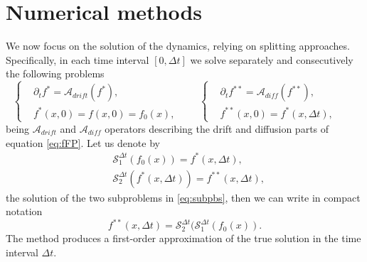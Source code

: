 \documentclass[11pt,handout]{article}%
\numberwithin{equation}{section}
\theoremstyle{definition}
\begin{document}
\section{Numerical methods }\label{sec:numerical_methods}
We now focus on the solution of the dynamics, relying on splitting approaches. Specifically, in each time interval $[0,\Delta t]$ we solve separately and consecutively the following problems 
\begin{equation}\label{eq:subpbs}
	\begin{cases}
		&\partial_t f^* = \mathcal{A}_{drift}(f^*),\\
		& f^*(x,0) = f(x,0) = f_0(x),
	\end{cases}\qquad 
	\begin{cases}
		&\partial_t f^{**}= \mathcal{A}_{diff}(f^{**}),\\
		& f^{**}(x,0) = f^*(x,\Delta t),
	\end{cases}\qquad 
\end{equation}
being $\mathcal{A}_{drift}$ and $\mathcal{A}_{diff}$ operators describing the drift and diffusion parts of equation \eqref{eq:fFP}. Let us denote by 
\begin{equation}
	\begin{split}
		&\mathcal{S}_1^{\Delta t} (f_0(x)) = f^*(x,\Delta t),\\ 
		&\mathcal{S}_2^{\Delta t} (f^{*}(x,\Delta t)) = f^{**}(x,\Delta t), 
	\end{split}
\end{equation}
the solution of the two subproblems in \eqref{eq:subpbs}, then we can write in compact notation
\begin{equation*}
	f^{**}(x,\Delta t) =    \mathcal{S}_2^{\Delta t}(\mathcal{S}_1^{\Delta t}(f_0(x)).
\end{equation*}
The method produces a first-order approximation of the true solution in the time interval $\Delta t$.
\end{document}
